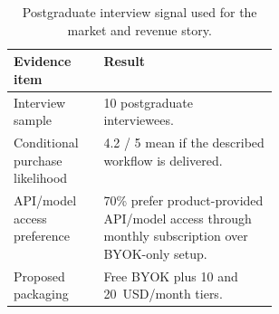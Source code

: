 \begin{table}[t]
  \caption{Postgraduate interview signal used for the market and revenue story.}
  \label{tab:market-validation}
  \centering
  \small
  \setlength{\tabcolsep}{4pt}
  \begin{tabularx}{\linewidth}{p{0.34\linewidth}Y}
    \toprule
    Evidence item & Result \\
    \midrule
    Interview sample & 10 postgraduate interviewees. \\
    Conditional purchase likelihood & 4.2 / 5 mean if the described workflow is delivered. \\
    API/model access preference & 70\% prefer product-provided API/model access through monthly subscription over BYOK-only setup. \\
    Proposed packaging & Free BYOK plus 10 and 20~USD/month tiers. \\
    \bottomrule
  \end{tabularx}
\end{table}
